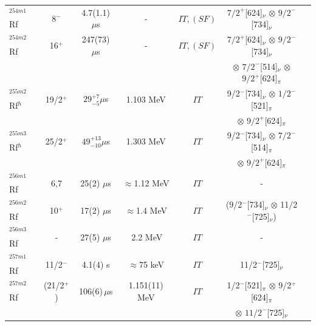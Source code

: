 \begin{center}
\begin{longtable}{lcccccl}
$^{254m1}$Rf& 8$^-$    & 4.7(1.1) $\mu$s  & - & $IT,(SF)$   & $7/2^+$[624]$_\nu$ $\otimes$ $9/2^-$[734]$_\nu$
                                                                     & \cite{David2015}\\
$^{254m2}$Rf& 16$^+$  &247(73) $\mu$s & - & $IT,(SF)$   & $7/2^+$[624]$_\nu$ $\otimes$ $9/2^-$[734]$_\nu$
                                                                     & \cite{David2015}\\
&&&&                                             &$\otimes$ $7/2^-$[514]$_\nu$ $\otimes$ $9/2^+$[624]$_\pi$\\ 
$^{255m2}$Rf$^h$& 19/2$^+$ & $29^{+7}_{-5} \mu$s  & 1.103 MeV& $IT$  
                                                &9/2$^-$[734]$_\nu$ $\otimes$ $1/2^-$[521]$_\pi$ 
                                                                   & \cite{Mosat2020a}\\
          &        &         &         &            & $\otimes$ $9/2^+$[624]$_\pi$& \cite{Chakma2023}\\
$^{255m3}$Rf$^h$& 25/2$^+$ & $49^{+13}_{-10} \mu$s  & 1.303 MeV& $IT$  
                                                 &9/2$^-$[734]$_\nu$ $\otimes$ $7/2^-$[514]$_\pi$
                                                                    & \cite{Mosat2020a}\\
          &        &         &         &            & $\otimes$ $9/2^+$[624]$_\pi$ & \cite{Chakma2023}\\
$^{256m1}$Rf& 6,7    & 25(2) $\mu$s  &$\approx$1.12 MeV& $IT$   &
                      -                                               & \cite{Jeppesen2009}\\
$^{256m2}$Rf& 10$^+$  & 17(2) $\mu$s  &$\approx$1.4 MeV& $IT$   &
                     (9/2$^-$[734]$_\nu$ $\otimes$ 11/2$^-$[725]$_\nu$) & \cite{Jeppesen2009}\\
$^{256m3}$Rf& -  & 27(5) $\mu$s  &$\>$2.2 MeV& $IT$   &
                     -                                                & \cite{Jeppesen2009}\\
$^{257m1}$Rf&  11/2$^-$ & 4.1(4) s  & $\approx$75 keV& $IT$   & 
             11/2$^-$[725]$_\nu$& \cite{Berryman2010}\\
$^{257m2}$Rf& (21/2$^+$) & 106(6)\,$\mu$s  &1.151(11) MeV& $IT$   &
                     1/2$^-$[521]$_\pi$ $\otimes$ 9/2$^+$[624]$_\pi$ 
                                                                   & \cite{Qian2009}\\
          &        &         &         &            & $\otimes$ $11/2^-$[725]$_\nu$ & \cite{Berryman2010}\\

\end{longtable}
\end{center}
